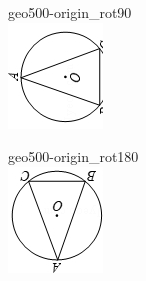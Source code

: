 \documentclass[12pt]{article}
\begin{document}
\begin{center}
\begin{minipage}{0.32\textwidth}
\end{minipage}
\hfill\begin{minipage}{0.32\textwidth}\centering
geo500-origin\_rot90\\
\includegraphics[width=0.95\linewidth]{out_rommath_origin/items/geo500-origin/assets/figure_rot90.png}
\end{minipage}
\par\medskip
\begin{minipage}{0.32\textwidth}\centering
geo500-origin\_rot180\\
\includegraphics[width=0.95\linewidth]{out_rommath_origin/items/geo500-origin/assets/figure_rot180.png}

\end{minipage}
\end{center}
\end{document}
